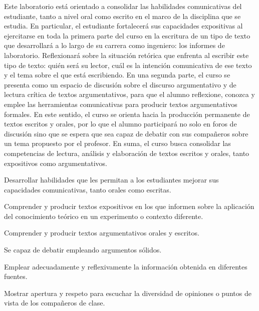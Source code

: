 \begin{syllabus}


\begin{justification}
Este laboratorio está orientado a consolidar las habilidades comunicativas del estudiante, tanto a nivel oral como escrito en el marco de la disciplina que se estudia. En particular, el estudiante fortalecerá sus capacidades expositivas al ejercitarse en toda la primera parte del curso en la escritura de un tipo de texto que
desarrollará a lo largo de su carrera como ingeniero: los informes de laboratorio. Reflexionará sobre la situación retórica que enfrenta al escribir este tipo de texto: quién será su lector, cuál es la intención comunicativa de ese texto y el tema sobre el que está escribiendo.
En una segunda parte, el curso se presenta como un espacio de discusión sobre el discurso argumentativo y de lectura crítica de textos argumentativos, para que el alumno reflexione, conozca y emplee las herramientas comunicativas para producir textos argumentativos formales. En este sentido, el curso se orienta hacia la producción
permanente de textos escritos y orales, por lo que el alumno participará no solo en foros de discusión sino que se espera que sea capaz de debatir con sus compañeros sobre un tema propuesto por el profesor. En suma, el curso busca consolidar las competencias de lectura, análisis y elaboración de textos escritos y orales, tanto expositivos como argumentativos.
\end{justification}

\begin{goals}
\item Desarrollar habilidades que les permitan a los estudiantes mejorar sus capacidades comunicativas, tanto orales como escritas.
\item Comprender y producir textos expositivos en los que informen sobre la aplicación del conocimiento teórico en un experimento o contexto diferente.
\item Comprender y producir textos argumentativos orales y escritos.
\item Se capaz de debatir empleando argumentos sólidos.
\item Emplear adecuadamente y reflexivamente la información obtenida en diferentes fuentes.
\item Mostrar apertura y respeto para escuchar la diversidad de opiniones o puntos de vista de los compañeros de clase.


\end{goals}
\end{syllabus}
